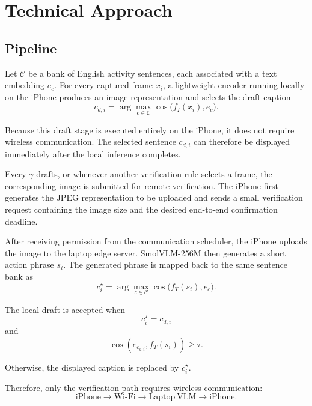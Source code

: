 \section{Technical Approach}

\subsection{Pipeline}

Let $\mathcal{C}$ be a bank of English activity sentences, each associated
with a text embedding $e_c$. For every captured frame $x_i$, a lightweight
encoder running locally on the iPhone produces an image representation and
selects the draft caption
\begin{equation}
c_{d,i}
=
\arg\max_{c\in\mathcal{C}}
\cos\big(f_I(x_i),e_c\big).
\end{equation}

Because this draft stage is executed entirely on the iPhone, it does not
require wireless communication. The selected sentence $c_{d,i}$ can therefore
be displayed immediately after the local inference completes.

Every $\gamma$ drafts, or whenever another verification rule selects a frame,
the corresponding image is submitted for remote verification. The iPhone
first generates the JPEG representation to be uploaded and sends a small
verification request containing the image size and the desired end-to-end
confirmation deadline.

After receiving permission from the communication scheduler, the iPhone
uploads the image to the laptop edge server. SmolVLM-256M then generates a
short action phrase $s_i$. The generated phrase is mapped back to the same
sentence bank as
\begin{equation}
c_i^\star
=
\arg\max_{c\in\mathcal{C}}
\cos\big(f_T(s_i),e_c\big).
\end{equation}

The local draft is accepted when
\begin{equation}
c_i^\star=c_{d,i}
\end{equation}
and
\begin{equation}
\cos(e_{c_{d,i}},f_T(s_i))\geq\tau.
\end{equation}

Otherwise, the displayed caption is replaced by $c_i^\star$.

Therefore, only the verification path requires wireless communication:
\[
\mathrm{iPhone}
\rightarrow
\mathrm{Wi\mbox{-}Fi}
\rightarrow
\mathrm{Laptop~VLM}
\rightarrow
\mathrm{iPhone}.
\]

